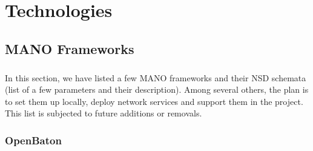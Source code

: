 \chapter{Technologies}
\label{ch:Technologies}

\section{MANO Frameworks}

\paragraph{}
In this section, we have listed a few MANO frameworks and their NSD schemata (list of a few parameters and their description). Among several others, the plan is to set them up locally, deploy network services and support them in the project. This list is subjected to future additions or removals.

\subsection{OpenBaton}
